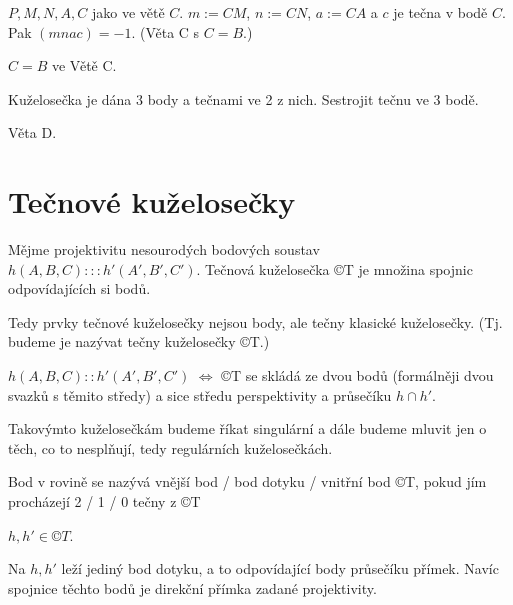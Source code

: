 \documentclass[12pt]{article}					%
\begin{document}
\begin{veta}[D]
	$P, M, N, A, C$ jako ve větě $C$. $m:=CM$, $n:=CN$, $a:=CA$ a $c$ je tečna v bodě $C$. Pak $(mnac) = -1$. (Věta C s $C = B$.)

	\begin{dukazin}
		$C = B$ ve Větě C.
	\end{dukazin}
\end{veta}

\begin{priklad}[Konstrukce]
	Kuželosečka je dána 3 body a tečnami ve 2 z nich. Sestrojit tečnu ve 3 bodě.

	\begin{reseni}
		Věta D.
	\end{reseni}
\end{priklad}


\section{Tečnové kuželosečky}
\begin{definice}
	Mějme projektivitu nesourodých bodových soustav $h(A, B, C):::h'(A', B', C')$. Tečnová kuželosečka ©T je množina spojnic odpovídajících si bodů.

	\begin{poznamkain}
		Tedy prvky tečnové kuželosečky nejsou body, ale tečny klasické kuželosečky. (Tj. budeme je nazývat tečny kuželosečky ©T.)
	\end{poznamkain}
\end{definice}

\begin{veta}
	$h(A, B, C)::h'(A', B', C')$ $\Leftrightarrow$ ©T se skládá ze dvou bodů (formálněji dvou svazků s těmito středy) a sice středu perspektivity a průsečíku $h \cap h'$.
\end{veta}

\begin{poznamkain}
	Takovýmto kuželosečkám budeme říkat singulární a dále budeme mluvit jen o těch, co to nesplňují, tedy regulárních kuželosečkách.
\end{poznamkain}

\begin{definice}
	Bod v rovině se nazývá vnější bod / bod dotyku / vnitřní bod ©T, pokud jím procházejí 2 / 1 / 0 tečny z ©T
\end{definice}

\begin{dusledek}
	$h, h' \in ©T$.

	Na $h, h'$ leží jediný bod dotyku, a to odpovídající body průsečíku přímek. Navíc spojnice těchto bodů je direkční přímka zadané projektivity.
\end{dusledek}
\end{document}
